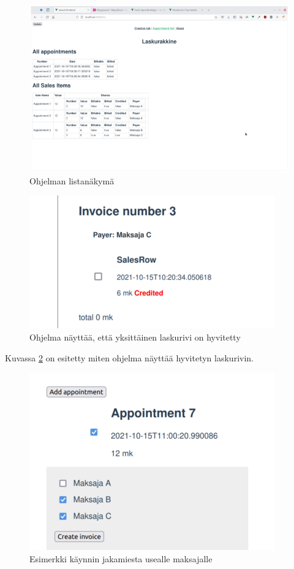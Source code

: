 \begin{figure}
\centering
\includegraphics{illustration/screenshots/List-view.png}
\caption{\label{rakkine_list-view}Ohjelman listanäkymä}
\end{figure}

\begin{figure}
\centering
\includegraphics{illustration/screenshots/credited.png}
\caption{\label{rakkine_credited}Ohjelma näyttää, että yksittäinen
laskurivi on hyvitetty}
\end{figure}

Kuvassa \ref{rakkine_credited} on esitetty miten ohjelma näyttää
hyvitetyn laskurivin.

\begin{figure}
\centering
\includegraphics{illustration/screenshots/Dividing.png}
\caption{\label{rakkine_dividing}Esimerkki käynnin jakamiesta usealle
maksajalle}
\end{figure}

